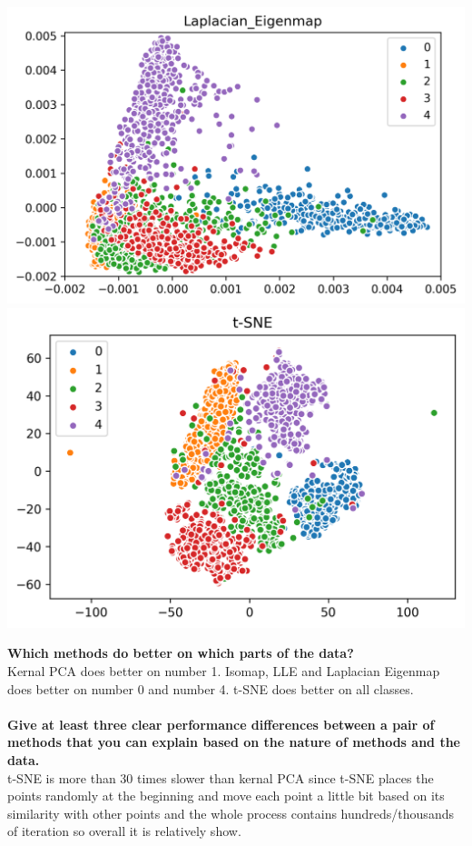 \documentclass[12pt]{article}
\begin{document}
\begin{center}
    \includegraphics[width=15cm]{Q3_Laplacian_Eigenmap.png}
    \includegraphics[width=15cm]{Q3_t-SNE.png}
\end{center}
\noindent
\textbf{Which methods do better on which parts of the data?}\\
Kernal PCA does better on number 1. Isomap, LLE and Laplacian Eigenmap does better on number 0 and number 4. t-SNE does better on all classes.\\\\
\textbf{Give at least three clear performance differences between a pair of methods that you can explain based on the nature of methods and the data.}\\
t-SNE is more than 30 times slower than kernal PCA since t-SNE places the points randomly at the beginning and move each point a little bit based on its similarity with other points and the whole process contains hundreds/thousands of iteration so overall it is relatively show.\\\\
\end{document}
